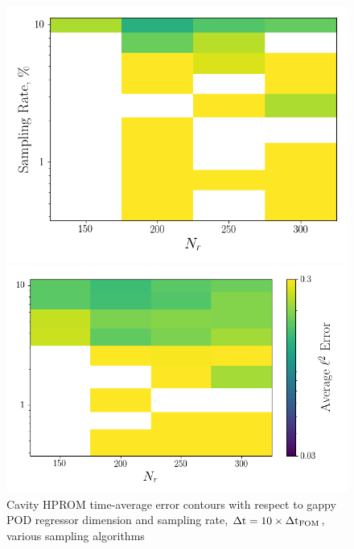 \begin{figure}
	\begin{minipage}{0.46\linewidth}
		\includegraphics[width=0.99\linewidth]{Chapters/CavityAndCVRC/Images/cavity/deim/err_contour_gnat1_dt1e-5.png}
	\end{minipage}
	\begin{minipage}{0.53\linewidth}
		\includegraphics[width=0.99\linewidth]{Chapters/CavityAndCVRC/Images/cavity/deim/err_contour_gnat2_dt1e-5.png}
	\end{minipage}
	\caption{Cavity HPROM time-average error contours with respect to gappy POD regressor dimension and sampling rate, $\Delta \text{t} = 10 \times \Delta \text{t}_{\text{FOM}}$, various sampling algorithms}
\end{figure}